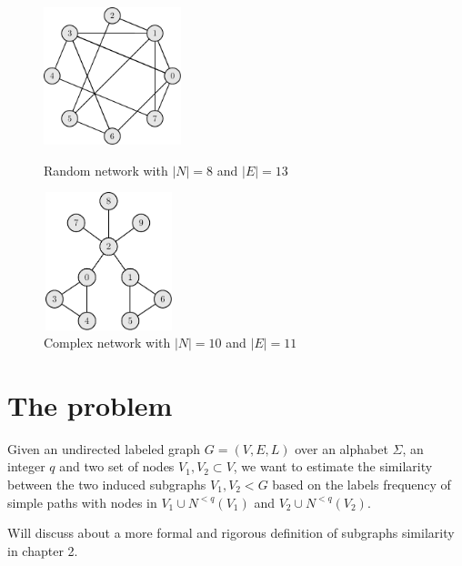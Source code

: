 \begin{figure}[h]
	\centering
	\begin{minipage}[t]{.45\textwidth}
		\centering
		\includegraphics[width=4cm,height=4cm]{figure/figure-1-3}
		\caption{Random network with $|N| = 8$ and $|E| = 13$}
	\end{minipage}\hfill
	\begin{minipage}[t]{.45\textwidth}
		\centering
		\includegraphics[width=3.8cm,height=4cm]{figure/figure-1-4}
		\caption{Complex network with $|N| = 10$ and $|E| = 11$}
	\end{minipage}
\end{figure}
\section{The problem}

\begin{problema}
Given an undirected labeled graph $G=(V,E,L)$ over an alphabet $\Sigma$, an integer $q$
and two set of nodes $V_{1}, V_{2} \subset V$, we want to estimate the similarity between the two induced subgraphs $V_{1}, V_{2} < G$ based on the labels frequency of simple paths with nodes in $V_{1} \cup N^{<q}(V_{1})$ and $V_{2} \cup N^{<q}(V_{2})$.

\end{problema}

Will discuss about a more formal and rigorous definition of subgraphs similarity in chapter 2.\\

